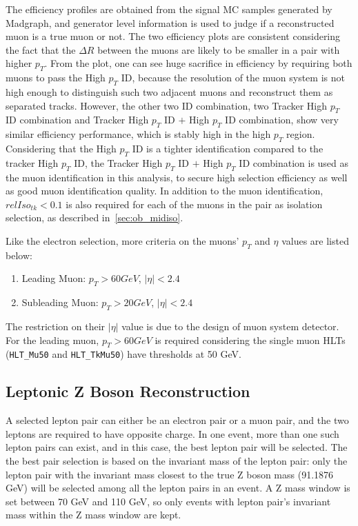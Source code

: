 \vspace{0.3cm}
The efficiency profiles are obtained from the signal MC samples generated by Madgraph, and generator level information is used to judge if a reconstructed muon is a true muon or not. The two efficiency plots are consistent considering the fact that the $\Delta R$ between the muons are likely to be smaller in a pair with higher $p_T$. From the plot, one can see huge sacrifice in efficiency by requiring both muons to pass the High $p_T$ ID, because the resolution of the muon system is not high enough to distinguish such two adjacent muons and reconstruct them as separated tracks. However, the other two ID combination, two Tracker High $p_T$ ID combination and Tracker High $p_T$ ID $+$ High $p_T$ ID combination, show very similar efficiency performance, which is stably high in the high $p_T$ region. Considering that the High $p_T$ ID is a tighter identification compared to the tracker High $p_T$ ID, the Tracker High $p_T$ ID $+$ High $p_T$ ID combination is used as the muon identification in this analysis, to secure high selection efficiency as well as good muon identification quality. In addition to the muon identification, $relIso_{tk}<0.1$ is also required for each of the muons in the pair as isolation selection, as described in~\ref{sec:ob_midiso}.

\vspace{0.3cm}
Like the electron selection, more criteria on the muons' $p_T$ and $\eta$ values are listed below:
\begin{enumerate}
\item Leading Muon: $p_T >60 GeV$, $|\eta|<2.4$
\item Subleading Muon: $p_T >20 GeV$, $|\eta|<2.4$
\end{enumerate}

The restriction on their $|\eta|$ value is due to the design of muon system detector. For the leading muon, $p_T >60 GeV$ is required considering the single muon HLTs (\texttt{HLT\_Mu50} and \texttt{HLT\_TkMu50}) have thresholds at 50 GeV.

\subsection{Leptonic Z Boson Reconstruction}
A selected lepton pair can either be an electron pair or a muon pair, and the two leptons are required to have opposite charge. In one event, more than one such lepton pairs can exist, and in this case, the best lepton pair will be selected. The the best pair selection is based on the invariant mass of the lepton pair: only the lepton pair with the invariant mass closest to the true Z boson mass (91.1876 GeV) will be selected among all the lepton pairs in an event. A Z mass window is set between 70 GeV and 110 GeV, so only events with lepton pair's invariant mass within the Z mass window are kept.

